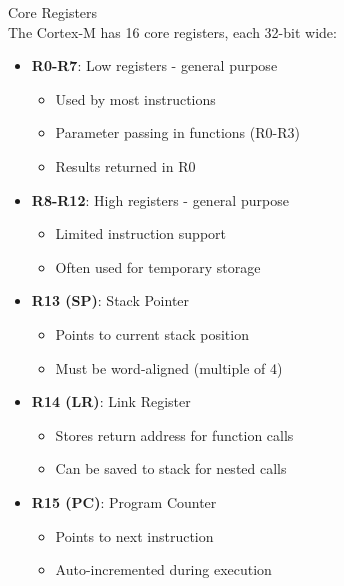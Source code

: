 \begin{definition}{Core Registers}\\
The Cortex-M has 16 core registers, each 32-bit wide:
\begin{itemize}
  \item \textbf{R0-R7}: Low registers - general purpose
    \begin{itemize}
      \item Used by most instructions
      \item Parameter passing in functions (R0-R3)
      \item Results returned in R0
    \end{itemize}
  \item \textbf{R8-R12}: High registers - general purpose
    \begin{itemize}
      \item Limited instruction support
      \item Often used for temporary storage
    \end{itemize}
  \item \textbf{R13 (SP)}: Stack Pointer
    \begin{itemize}
      \item Points to current stack position
      \item Must be word-aligned (multiple of 4)
    \end{itemize}
  \item \textbf{R14 (LR)}: Link Register
    \begin{itemize}
      \item Stores return address for function calls
      \item Can be saved to stack for nested calls
    \end{itemize}
  \item \textbf{R15 (PC)}: Program Counter
    \begin{itemize}
      \item Points to next instruction
      \item Auto-incremented during execution
    \end{itemize}
\end{itemize}
\end{definition}

